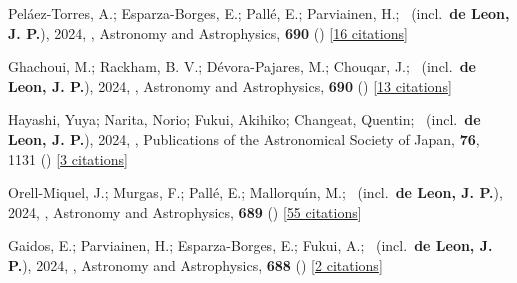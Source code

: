 \item[{\color{numcolor}\scriptsize74}] Pel{\'a}ez-Torres, A.; Esparza-Borges, E.; Pall{\'e}, E.; Parviainen, H.; \etal\ (incl.\ \textbf{de Leon, J. P.}), 2024, , Astronomy and Astrophysics, \textbf{690} () [\href{https://ui.adsabs.harvard.edu/abs/2024A&A...690A..62P}{16 citations}]

\item[{\color{numcolor}\scriptsize73}] Ghachoui, M.; Rackham, B. V.; D{\'e}vora-Pajares, M.; Chouqar, J.; \etal\ (incl.\ \textbf{de Leon, J. P.}), 2024, , Astronomy and Astrophysics, \textbf{690} () [\href{https://ui.adsabs.harvard.edu/abs/2024A&A...690A.263G}{13 citations}]

\item[{\color{numcolor}\scriptsize72}] Hayashi, Yuya; Narita, Norio; Fukui, Akihiko; Changeat, Quentin; \etal\ (incl.\ \textbf{de Leon, J. P.}), 2024, , Publications of the Astronomical Society of Japan, \textbf{76}, 1131 () [\href{https://ui.adsabs.harvard.edu/abs/2024PASJ...76.1131H}{3 citations}]

\item[{\color{numcolor}\scriptsize71}] Orell-Miquel, J.; Murgas, F.; Pall{\'e}, E.; Mallorqu{\'\i}n, M.; \etal\ (incl.\ \textbf{de Leon, J. P.}), 2024, , Astronomy and Astrophysics, \textbf{689} () [\href{https://ui.adsabs.harvard.edu/abs/2024A&A...689A.179O}{55 citations}]

\item[{\color{numcolor}\scriptsize70}] Gaidos, E.; Parviainen, H.; Esparza-Borges, E.; Fukui, A.; \etal\ (incl.\ \textbf{de Leon, J. P.}), 2024, , Astronomy and Astrophysics, \textbf{688} () [\href{https://ui.adsabs.harvard.edu/abs/2024A&A...688L..34G}{2 citations}]

